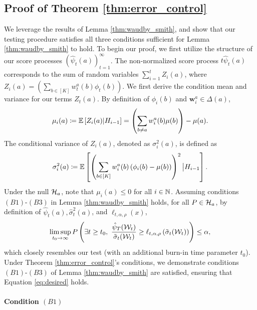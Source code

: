 \documentclass{article}
\begin{document}
\begin{appendices}
\subsection{Proof of Theorem \ref{thm:error_control}}
We leverage the results of Lemma \ref{thm:waudby_smith}, and show that our testing procedure satisfies all three conditions sufficient for Lemma \ref{thm:waudby_smith} to hold. To begin our proof, we first utilize the structure of our score processes $\left( \hat\psi_t(a) \right)_{t=1}^\infty$. The non-normalized score process $t\hat\psi_t(a)$ corresponds to the sum of random variables $\sum_{i=1}^t Z_i(a)$, where $Z_i(a) = \left(\sum_{b \in [K]} w_t^a(b) \phi_t(b) \right)$. We first derive the condition mean and variance for our terms $Z_t(a)$. By definition of $\phi_i(b)$ and $\bm{w}_i^a \in \Delta(a)$,
\begin{equation}
    \mu_i(a) \coloneqq \mathbb{E}\left[ Z_i(a) | H_{i-1}\right] = \left(\sum_{b \neq a} w_i^a(b)\mu(b)\right) - \mu(a). 
\end{equation}
The conditional variance of $Z_i(a)$, denoted as $\sigma_i^2(a)$, is defined as 
\begin{equation}
    \sigma_i^2(a) \coloneqq \mathbb{E}\left[\left(\sum_{b \in [K]} w_i^a(b) \left(\phi_i(b) - \mu(b)\right)\right)^2 \big| H_{i-1}  \right].
\end{equation}
Under the null $\mathcal{H}_a$, note that $\mu_i(a) \leq 0$ for all $i \in \mathbb{N}$. Assuming conditions $(B1)$-$(B3)$ in Lemma \ref{thm:waudby_smith} holds, for all $P \in \mathcal{H}_a$, by definition of $\hat\psi_t(a), \hat\sigma^2_t(a)$, and $\ell_{t,\alpha,\rho}(x)$, 
\begin{equation}\label{eq:desired}
    \limsup_{t_0 \rightarrow \infty}P\left(\exists t \geq t_0, \  \frac{\hat\psi_T(\mathcal{W}_t)}{\tilde\sigma_t(\mathcal{W}_t)}\geq \ell_{t,\alpha, \rho}\left(\tilde\sigma_t(\mathcal{W}_t)\right) \right) \leq \alpha,
\end{equation}
which closely resembles our test (with an additional burn-in time parameter $t_0$). Under Theorem \ref{thm:error_control}'s conditions, we demonstrate conditions $(B1)$-$(B3)$ of Lemma \ref{thm:waudby_smith} are satisfied, ensuring that Equation \eqref{eq:desired} holds.  


\paragraph{Condition $(B1)$}


\end{appendices}
\end{document}
